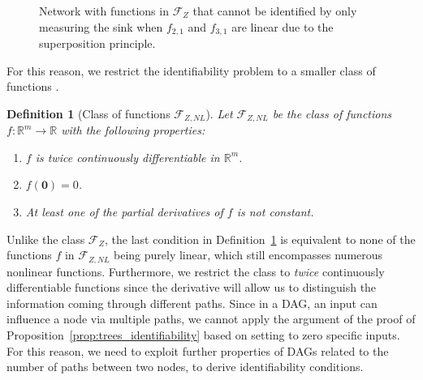 \documentclass[letterpaper,10pt,journal]{IEEEtran}
\newcommand{\Fone}{\mathcal{F}_Z}
\newcommand{\Ftwo}{\mathcal{F}_{Z,NL}}
\newtheorem{definition}{Definition}
\newcommand{\R}{\mathbb R}
\newcommand{\zero}{\mathbf{0}}
\begin{document}
\begin{figure}
    \centering
    \caption{Network with functions in $\Fone$ that cannot be identified by only measuring the sink when $f_{2,1}$ and $f_{3,1}$ are linear due to the superposition principle.}
    \label{fig:bridge_graph}
\end{figure}



For this reason, we restrict the identifiability problem to a smaller class of functions \cite{vizuete2023nonlinear}.


\begin{definition}[Class of functions $\Ftwo$]\label{def:class_Ftwo}
Let $\Ftwo$ be the class of functions $f:\R^m\to\R$ with the following properties:
\begin{enumerate}
    \item $f$ is twice continuously differentiable in $\R^m$.
    \item $f(\zero)=0$.
    \item At least one of the partial derivatives of $f$ is not constant.    
\end{enumerate}
\end{definition}

Unlike the class $\Fone$, the last condition in Definition~\ref{def:class_Ftwo} is equivalent to none of the functions $f$ in $\Ftwo$ being purely linear, which still encompasses numerous nonlinear functions. Furthermore, we restrict the class to \emph{twice} continuously differentiable functions since the derivative will allow us to distinguish the information coming through different paths.
Since in a DAG, an input can influence a node via multiple paths, we cannot apply the argument of the proof of Proposition~\ref{prop:trees_identifiability} based on setting to zero specific inputs. 
For this reason, we need to exploit further properties of DAGs related to the number of paths between two nodes, to derive identifiability conditions.
\end{document}

